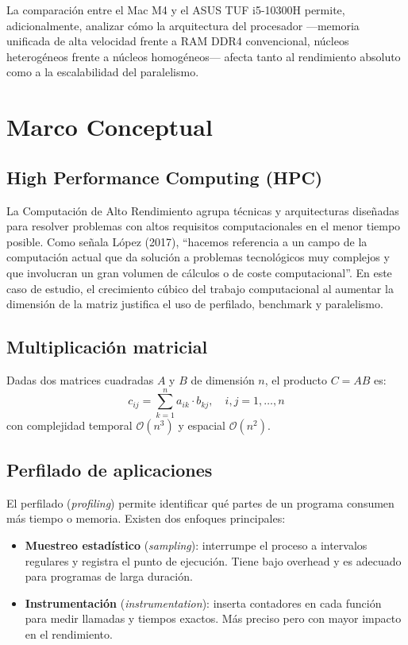 \documentclass{article}
\begin{document}
La comparación entre el Mac M4 y el ASUS TUF i5-10300H permite, adicionalmente, analizar cómo la arquitectura del procesador ---memoria unificada de alta velocidad frente a RAM DDR4 convencional, núcleos heterogéneos frente a núcleos homogéneos--- afecta tanto al rendimiento absoluto como a la escalabilidad del paralelismo.

\section{Marco Conceptual}

\subsection{High Performance Computing (HPC)}

La Computación de Alto Rendimiento agrupa técnicas y arquitecturas diseñadas para resolver problemas con altos requisitos computacionales en el menor tiempo posible. Como señala López (2017), ``hacemos referencia a un campo de la computación actual que da solución a problemas tecnológicos muy complejos y que involucran un gran volumen de cálculos o de coste computacional''. En este caso de estudio, el crecimiento cúbico del trabajo computacional al aumentar la dimensión de la matriz justifica el uso de perfilado, benchmark y paralelismo.

\subsection{Multiplicación matricial}

Dadas dos matrices cuadradas $A$ y $B$ de dimensión $n$, el producto $C = AB$ es:
\[ c_{ij} = \sum_{k=1}^{n} a_{ik} \cdot b_{kj}, \quad i,j = 1,\ldots,n \]
con complejidad temporal $\mathcal{O}(n^3)$ y espacial $\mathcal{O}(n^2)$.

\subsection{Perfilado de aplicaciones}

El perfilado (\emph{profiling}) permite identificar qué partes de un programa consumen más tiempo o memoria. Existen dos enfoques principales:
\begin{itemize}
    \item \textbf{Muestreo estadístico} (\emph{sampling}): interrumpe el proceso a intervalos regulares y registra el punto de ejecución. Tiene bajo overhead y es adecuado para programas de larga duración.
    \item \textbf{Instrumentación} (\emph{instrumentation}): inserta contadores en cada función para medir llamadas y tiempos exactos. Más preciso pero con mayor impacto en el rendimiento.
\end{itemize}
\end{document}
